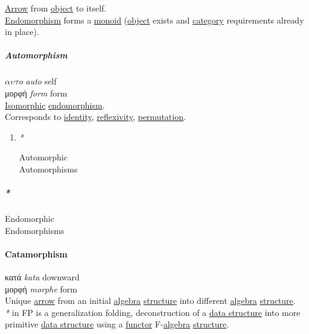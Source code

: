 \documentclass[11pt]{article}
\begin{document}
\hyperref[org03967f4]{Arrow} from \hyperref[org4be0e9d]{object} to itself.\\
\hyperref[orgcbe9cbb]{Endomorphism} forms a \hyperref[org37d140b]{monoid} (\hyperref[org4be0e9d]{object} exists and \hyperref[org0450535]{category} requirements already in place).\\

\subparagraph{\label{org4f0787d}Automorphism}
\label{sec:org465017f}
\(\alpha \upsilon \tau\)\textit{o} \emph{auto} self\\
μορφή \emph{form} form\\

\hyperref[org5910739]{Isomorphic} \hyperref[orgcbe9cbb]{endomorphism}.\\

Corresponds to \hyperref[org9b95fd5]{identity}, \hyperref[orge9d4ceb]{reflexivity}, \hyperref[org2357754]{permutation}.\\

\begin{enumerate}
\item \emph{*}
\label{sec:org7fb7df5}

\label{org36f7206}Automorphic\\
\label{org7c74bc4}Automorphisms\\
\end{enumerate}

\subparagraph{\emph{*}}
\label{sec:org9fc2f34}

\label{org39a3d8d}Endomorphic\\
\label{org4d5a2ab}Endomorphisms\\

\paragraph{\label{orgefe2953}Catamorphism}
\label{sec:org8445048}
κατά \emph{kata} downward\\
μορφή \emph{morphe} form\\

Unique \hyperref[org03967f4]{arrow} from an initial \hyperref[orgecfec51]{algebra} \hyperref[org8051f61]{structure} into different \hyperref[orgecfec51]{algebra} \hyperref[org8051f61]{structure}.\\

\emph{*} in FP is a generalization folding, deconstruction of a \hyperref[org51ce163]{data structure} into more primitive \hyperref[org51ce163]{data structure} using a \hyperref[orgf2f6841]{functor} F-\hyperref[orgecfec51]{algebra} \hyperref[org8051f61]{structure}.\\
\end{document}
